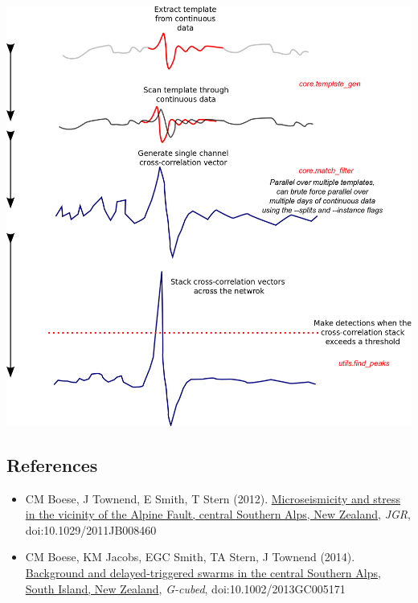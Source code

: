 \documentclass[a4paper,10pt,english]{sphinxmanual}
\begin{document}
{\hfill\includegraphics{processing_flow.png}\hfill}


\subsection{References}
\label{tutorial:references}\begin{itemize}
\item {} 
CM Boese, J Townend, E Smith, T Stern (2012). \href{http://onlinelibrary.wiley.com/doi/10.1029/2011JB008460/full}{Microseismicity and stress in the vicinity of the Alpine Fault, central Southern Alps, New Zealand}, \emph{JGR}, doi:10.1029/2011JB008460

\item {} 
CM Boese, KM Jacobs, EGC Smith, TA Stern, J Townend (2014). \href{http://onlinelibrary.wiley.com/doi/10.1002/2013GC005171/full}{Background and delayed-triggered swarms in the central Southern Alps, South Island, New Zealand}, \emph{G-cubed}, doi:10.1002/2013GC005171

\end{itemize}
\end{document}
